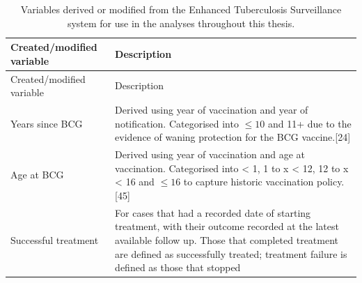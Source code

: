 \documentclass[11pt,twoside]{bristolthesis}
\begin{document}
  \begin{longtable}[]{@{}ll@{}}
  \caption{\label{tab:created-var} Variables derived or modified from the Enhanced Tuberculosis Surveillance system for use in the analyses throughout this thesis.}\tabularnewline
  \toprule
  \begin{minipage}[b]{0.33\columnwidth}\raggedright
  Created/modified variable\strut
  \end{minipage} & \begin{minipage}[b]{0.62\columnwidth}\raggedright
  Description\strut
  \end{minipage}\tabularnewline
  \midrule
  \endfirsthead
  \toprule
  \begin{minipage}[b]{0.33\columnwidth}\raggedright
  Created/modified variable\strut
  \end{minipage} & \begin{minipage}[b]{0.62\columnwidth}\raggedright
  Description\strut
  \end{minipage}\tabularnewline
  \midrule
  \endhead
  \begin{minipage}[t]{0.33\columnwidth}\raggedright
  Years since BCG\strut
  \end{minipage} & \begin{minipage}[t]{0.62\columnwidth}\raggedright
  Derived using year of vaccination and year of
  notification. Categorised into \(\leq 10\) and 11+
  due to the evidence of waning protection for the
  BCG vaccine.{[}24{]}\strut
  \end{minipage}\tabularnewline
  \begin{minipage}[t]{0.33\columnwidth}\raggedright
  Age at BCG\strut
  \end{minipage} & \begin{minipage}[t]{0.62\columnwidth}\raggedright
  Derived using year of vaccination and age at
  vaccination. Categorised into \textless{} 1, 1 to x \textless{} 12, 12
  to x \textless{} 16 and \(\leq 16\) to capture historic
  vaccination policy.{[}45{]}\strut
  \end{minipage}\tabularnewline
  \begin{minipage}[t]{0.33\columnwidth}\raggedright
  Successful treatment\strut
  \end{minipage} & \begin{minipage}[t]{0.62\columnwidth}\raggedright
  For cases that had a recorded date of starting
  treatment, with their outcome recorded at the
  latest available follow up. Those that completed
  treatment are defined as successfully treated;
  treatment failure is defined as those that stopped

\end{minipage}
\end{longtable}
\end{document}
